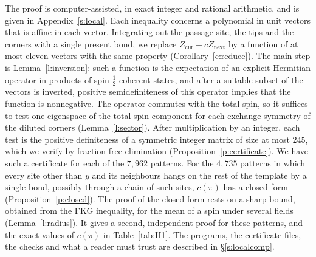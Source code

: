 The proof is computer-assisted, in exact integer and rational arithmetic, and is given in Appendix~\ref{s:local}. Each inequality concerns a polynomial in unit vectors that is affine in each vector. Integrating out the passage site, the tips and the corners with a single present bond, we replace $Z_{\mathrm{cur}} - c Z_{\mathrm{next}}$ by a function of at most eleven vectors with the same property (Corollary~\ref{c:reduce}). The main step is Lemma~\ref{l:inversion}: such a function is the expectation of an explicit Hermitian operator in products of spin-$\frac12$ coherent states, and after a suitable subset of the vectors is inverted, positive semidefiniteness of this operator implies that the function is nonnegative. The operator commutes with the total spin, so it suffices to test one eigenspace of the total spin component for each exchange symmetry of the diluted corners (Lemma~\ref{l:sector}). After multiplication by an integer, each test is the positive definiteness of a symmetric integer matrix of size at most $245$, which we verify by fraction-free elimination (Proposition~\ref{p:certificate}). We have such a certificate for each of the $7{,}962$ patterns. For the $4{,}735$ patterns in which every site other than $y$ and its neighbours hangs on the rest of the template by a single bond, possibly through a chain of such sites, $c(\pi)$ has a closed form (Proposition~\ref{p:closed}). The proof of the closed form rests on a sharp bound, obtained from the FKG inequality, for the mean of a spin under several fields (Lemma~\ref{l:radius}). It gives a second, independent proof for these patterns, and the exact values of $c(\pi)$ in Table~\ref{tab:H1}. The programs, the certificate files, the checks and what a reader must trust are described in \S\ref{s:localcomp}.

